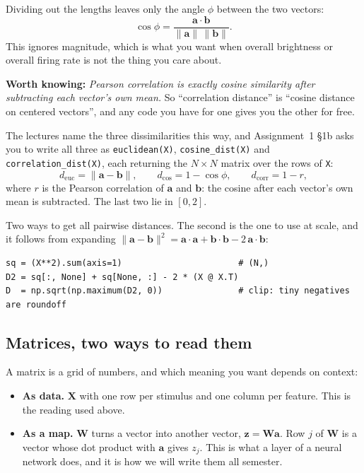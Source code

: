 \documentclass[11pt]{article}
\newcommand{\ask}[1]{\textcolor{accent}{\textbf{#1}}}
\begin{document}
Dividing out the lengths leaves only the angle $\phi$ between the two vectors:
\[
\cos\phi = \frac{\bm{a}\cdot\bm{b}}{\|\bm{a}\|\,\|\bm{b}\|}.
\]
This ignores magnitude, which is what you want when overall brightness or
overall firing rate is not the thing you care about.

\begin{keybox}
\ask{Worth knowing:} \emph{Pearson correlation is exactly cosine similarity
after subtracting each vector's own mean.} So ``correlation distance'' is
``cosine distance on centered vectors'', and any code you have for one gives
you the other for free.
\end{keybox}

The lectures name the three dissimilarities this way, and Assignment~1 \S1b
asks you to write all three as \texttt{euclidean(X)}, \texttt{cosine\_dist(X)}
and \texttt{correlation\_dist(X)}, each returning the $N \times N$ matrix over
the rows of \texttt{X}:
\[
d_{\mathrm{euc}} = \|\bm{a}-\bm{b}\|, \qquad
d_{\cos} = 1 - \cos\phi, \qquad
d_{\mathrm{corr}} = 1 - r,
\]
where $r$ is the Pearson correlation of $\bm{a}$ and $\bm{b}$: the cosine after
each vector's own mean is subtracted. The last two lie in $[0, 2]$.

Two ways to get all pairwise distances. The second is the one to use at scale,
and it follows from expanding $\|\bm{a}-\bm{b}\|^2 = \bm{a}\cdot\bm{a} +
\bm{b}\cdot\bm{b} - 2\,\bm{a}\cdot\bm{b}$:

\begin{lstlisting}
sq = (X**2).sum(axis=1)                       # (N,)
D2 = sq[:, None] + sq[None, :] - 2 * (X @ X.T)
D  = np.sqrt(np.maximum(D2, 0))               # clip: tiny negatives are roundoff
\end{lstlisting}

\subsection{Matrices, two ways to read them}

A matrix is a grid of numbers, and which meaning you want depends on context:

\begin{itemize}
\item \textbf{As data.} $\bm{X}$ with one row per stimulus and one column per
      feature. This is the reading used above.
\item \textbf{As a map.} $\bm{W}$ turns a vector into another vector,
      $\bm{z} = \bm{W}\bm{a}$. Row $j$ of $\bm{W}$ is a vector whose dot product
      with $\bm{a}$ gives $z_j$. This is what a layer of a neural network does,
      and it is how we will write them all semester.
\end{itemize}
\end{document}
